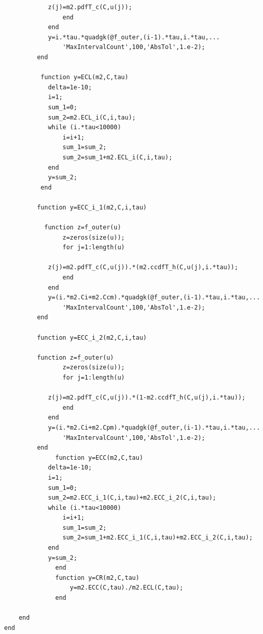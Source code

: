 \documentclass[10pt,a4paper]{article}
\theoremstyle{remark}
\begin{document}
\begin{appendices}
\begin{verbatim}
            z(j)=m2.pdfT_c(C,u(j));
                end
            end
            y=i.*tau.*quadgk(@f_outer,(i-1).*tau,i.*tau,...
                'MaxIntervalCount',100,'AbsTol',1.e-2);
         end
         
          function y=ECL(m2,C,tau)
            delta=1e-10;
            i=1;
            sum_1=0;
            sum_2=m2.ECL_i(C,i,tau);
            while (i.*tau<10000) 
                i=i+1;
                sum_1=sum_2;
                sum_2=sum_1+m2.ECL_i(C,i,tau);
            end
            y=sum_2;
          end
        
         function y=ECC_i_1(m2,C,i,tau)
          
           function z=f_outer(u)
                z=zeros(size(u));
                for j=1:length(u)
                    
            z(j)=m2.pdfT_c(C,u(j)).*(m2.ccdfT_h(C,u(j),i.*tau));
                end
            end
            y=(i.*m2.Ci+m2.Ccm).*quadgk(@f_outer,(i-1).*tau,i.*tau,...
                'MaxIntervalCount',100,'AbsTol',1.e-2);
         end
         
         function y=ECC_i_2(m2,C,i,tau)
          
         function z=f_outer(u)
                z=zeros(size(u));
                for j=1:length(u)
                    
            z(j)=m2.pdfT_c(C,u(j)).*(1-m2.ccdfT_h(C,u(j),i.*tau));
                end
            end
            y=(i.*m2.Ci+m2.Cpm).*quadgk(@f_outer,(i-1).*tau,i.*tau,...
                'MaxIntervalCount',100,'AbsTol',1.e-2);
         end
              function y=ECC(m2,C,tau)
            delta=1e-10;
            i=1;
            sum_1=0;
            sum_2=m2.ECC_i_1(C,i,tau)+m2.ECC_i_2(C,i,tau);
            while (i.*tau<10000) 
                i=i+1;
                sum_1=sum_2;
                sum_2=sum_1+m2.ECC_i_1(C,i,tau)+m2.ECC_i_2(C,i,tau);
            end
            y=sum_2;
              end
              function y=CR(m2,C,tau)
                  y=m2.ECC(C,tau)./m2.ECL(C,tau);
              end
        
    end
end


\end{verbatim}
\end{appendices}
\end{document}
